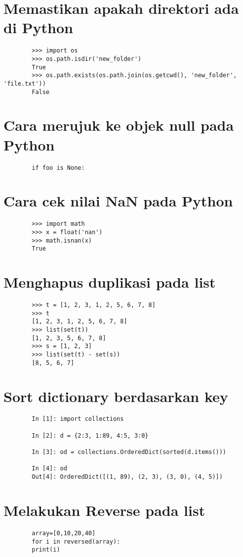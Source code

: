 \documentclass{article}
\begin{document}
	\section {Memastikan apakah direktori ada di Python}
	\begin{lstlisting}
		>>> import os
		>>> os.path.isdir('new_folder')
		True
		>>> os.path.exists(os.path.join(os.getcwd(), 'new_folder', 'file.txt'))
		False
	\end{lstlisting}
	
	\section {Cara merujuk ke objek null pada Python}
	\begin{lstlisting}
		if foo is None:
	\end{lstlisting}
	
	\section {Cara cek nilai NaN pada Python}
	\begin{lstlisting}
		>>> import math
		>>> x = float('nan')
		>>> math.isnan(x)
		True
	\end{lstlisting}
	
	\section {Menghapus duplikasi pada list}
	\begin{lstlisting}
		>>> t = [1, 2, 3, 1, 2, 5, 6, 7, 8]
		>>> t
		[1, 2, 3, 1, 2, 5, 6, 7, 8]
		>>> list(set(t))
		[1, 2, 3, 5, 6, 7, 8]
		>>> s = [1, 2, 3]
		>>> list(set(t) - set(s))
		[8, 5, 6, 7]
	\end{lstlisting}
	
	\section {Sort dictionary berdasarkan key}
	\begin{lstlisting}
		In [1]: import collections
		
		In [2]: d = {2:3, 1:89, 4:5, 3:0}
		
		In [3]: od = collections.OrderedDict(sorted(d.items()))
		
		In [4]: od
		Out[4]: OrderedDict([(1, 89), (2, 3), (3, 0), (4, 5)])
	\end{lstlisting}
	
	\section {Melakukan Reverse pada list}
	\begin{lstlisting}
		array=[0,10,20,40]
		for i in reversed(array):
		print(i)
	\end{lstlisting}
	
\end{document}

